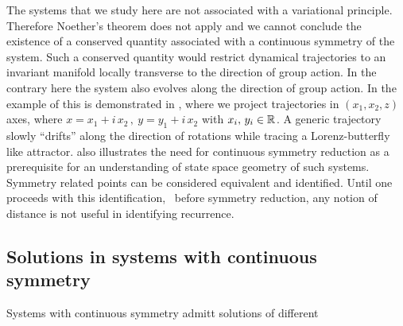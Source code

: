 The systems that we study here are not associated with a
variational principle. Therefore Noether's theorem does not
apply and we  cannot conclude the existence of a conserved
quantity associated with a continuous symmetry of the system.
Such a conserved quantity would restrict dynamical
trajectories to an invariant manifold locally transverse to
the direction of group action. In the contrary here the
system also evolves along the direction of group action. In
the example of {\CLe} this is demonstrated in
, where we project trajectories in
$(x_1,x_2,z)$ axes, where $x=x_1+ i\, x_2\,,\ y=y_1+i\, x_2$
with $x_i,\,y_i\in\mathbb{R}^{}$. A generic trajectory slowly ``drifts'' 
along the direction of rotations while tracing a Lorenz-butterfly
like attractor.  also
illustrates the need for continuous symmetry reduction as a
prerequisite for an understanding of state space geometry of
such systems. Symmetry related points can be considered equivalent
and identified. Until one proceeds with this identification, \ie\ before
symmetry reduction, any notion of distance is not useful in identifying recurrence.

\subsection{Solutions in systems with continuous symmetry}

Systems with continuous symmetry admitt solutions of different



